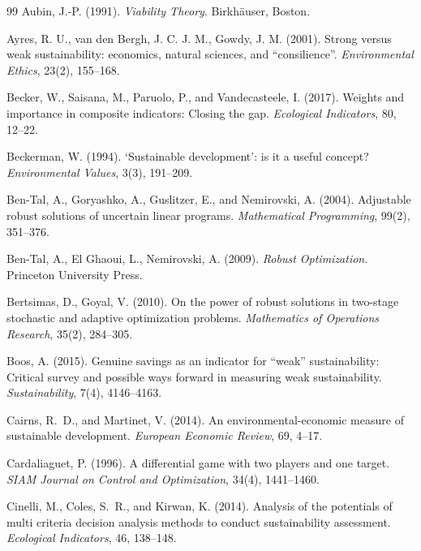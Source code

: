 \documentclass[preprint,11pt,authoryear]{elsarticle}
\theoremstyle{definition}
\theoremstyle{remark}
\begin{document}
\begin{thebibliography}{99}
 Aubin, J.-P. (1991). \emph{Viability Theory}. Birkh\"auser, Boston.

 Ayres, R. U., van den Bergh, J. C. J. M., Gowdy, J. M. (2001). Strong versus weak sustainability: economics, natural sciences, and ``consilience''. \emph{Environmental Ethics}, 23(2), 155--168.

 Becker, W., Saisana, M., Paruolo, P., and Vandecasteele, I. (2017). Weights and importance in composite indicators: Closing the gap. \emph{Ecological Indicators}, 80, 12--22.

 Beckerman, W. (1994). `Sustainable development': is it a useful concept? \emph{Environmental Values}, 3(3), 191--209.

 Ben-Tal, A., Goryashko, A., Guslitzer, E., and Nemirovski, A. (2004). Adjustable robust solutions of uncertain linear programs. \emph{Mathematical Programming}, 99(2), 351--376.

 Ben-Tal, A., El Ghaoui, L., Nemirovski, A. (2009). \emph{Robust Optimization}. Princeton University Press.

 Bertsimas, D., Goyal, V. (2010). On the power of robust solutions in two-stage stochastic and adaptive optimization problems. \emph{Mathematics of Operations Research}, 35(2), 284--305.

 Boos, A. (2015). Genuine savings as an indicator for ``weak'' sustainability: Critical survey and possible ways forward in measuring weak sustainability. \emph{Sustainability}, 7(4), 4146--4163.

 Cairns, R.~D., and Martinet, V. (2014). An environmental-economic measure of sustainable development. \emph{European Economic Review}, 69, 4--17.

 Cardaliaguet, P. (1996). A differential game with two players and one target. \emph{SIAM Journal on Control and Optimization}, 34(4), 1441--1460.

 Cinelli, M., Coles, S.~R., and Kirwan, K. (2014). Analysis of the potentials of multi criteria decision analysis methods to conduct sustainability assessment. \emph{Ecological Indicators}, 46, 138--148.


\end{thebibliography}
\end{document}
